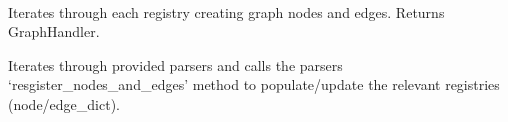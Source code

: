 \documentclass[letterpaper,10pt,english]{sphinxmanual}
\begin{document}
\begin{fulllineitems}
\label{code:gfunc.graphTools.GraphBuilder}~

\begin{fulllineitems}
\label{code:gfunc.graphTools.GraphBuilder.__init__}
\end{fulllineitems}


\begin{fulllineitems}
\label{code:gfunc.graphTools.GraphBuilder.map_registries_to_graph}
Iterates through each registry creating graph nodes and edges.  Returns GraphHandler.

\end{fulllineitems}


\begin{fulllineitems}
\label{code:gfunc.graphTools.GraphBuilder.populate_registries}
Iterates through provided parsers and calls the parsers `resgister\_nodes\_and\_edges'
method to populate/update the relevant registries (node/edge\_dict).

\end{fulllineitems}


\end{fulllineitems}

\end{document}
